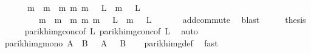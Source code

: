 \begin{isabellebody}
%
\isadelimproof
%
\endisadelimproof
%
\isatagproof
{}\isamarkupfalse%
\ {\isacharminus}{\kern0pt}\isanewline
\ \ \isamarkupfalse%
\ {\isachardoublequoteopen}{\isacharbraceleft}{\kern0pt}\ m{}\ {\isacharplus}{\kern0pt}\ m{}\ {\isacharbar}{\kern0pt}\ m{}\ m{}{\isachardot}{\kern0pt}\ m{}\ {\isasymin}\ {\isasymPsi}\ L{}\ {\isasymand}\ m{}\ {\isasymin}\ {\isasymPsi}\ L{}\ {\isacharbraceright}{\kern0pt}\ {\isacharequal}{\kern0pt}\ \isanewline
\ \ \ \ \ \ \ \ {\isacharbraceleft}{\kern0pt}\ m{}\ {\isacharplus}{\kern0pt}\ m{}\ {\isacharbar}{\kern0pt}\ m{}\ m{}{\isachardot}{\kern0pt}\ m{}\ {\isasymin}\ {\isasymPsi}\ L{}\ {\isasymand}\ m{}\ {\isasymin}\ {\isasymPsi}\ L{}\ {\isacharbraceright}{\kern0pt}{\isachardoublequoteclose}\isanewline
\ \ \ \ \isamarkupfalse%
\ add{\isachardot}{\kern0pt}commute\ \isamarkupfalse%
\ blast\isanewline
\ \ \isamarkupfalse%
\ \isamarkupfalse%
\ {\isacharquery}{\kern0pt}thesis\isanewline
\ \ \ \ \isamarkupfalse%
\ parikh{\isacharunderscore}{\kern0pt}img{\isacharunderscore}{\kern0pt}conc{\isacharbrackleft}{\kern0pt}of\ L{}{\isacharbrackright}{\kern0pt}\ parikh{\isacharunderscore}{\kern0pt}img{\isacharunderscore}{\kern0pt}conc{\isacharbrackleft}{\kern0pt}of\ L{}{\isacharbrackright}{\kern0pt}\ \isamarkupfalse%
\ auto\isanewline
{}\isamarkupfalse%
%
\endisatagproof
{\isafoldproof}%
%
\isadelimproof
%
\endisadelimproof
%
\isadelimdocument
%
\endisadelimdocument
%
\isatagdocument
%
\isamarkuptrue%
%
\endisatagdocument
{\isafolddocument}%
%
\isadelimdocument
%
\endisadelimdocument
{}\isamarkupfalse%
\ parikh{\isacharunderscore}{\kern0pt}img{\isacharunderscore}{\kern0pt}mono{\isacharcolon}{\kern0pt}\ {\isachardoublequoteopen}A\ {\isasymsubseteq}\ B\ {\isasymLongrightarrow}\ {\isasymPsi}\ A\ {\isasymsubseteq}\ {\isasymPsi}\ B{\isachardoublequoteclose}\isanewline
%
\isadelimproof
\ \ %
\endisadelimproof
%
\isatagproof
{}\isamarkupfalse%
\ parikh{\isacharunderscore}{\kern0pt}img{\isacharunderscore}{\kern0pt}def\ \isamarkupfalse%
\ fast%
\endisatagproof
{\isafoldproof}%
%
\isadelimproof
\isanewline
%
\endisadelimproof
\isanewline
{}\isamarkupfalse%

\end{isabellebody}
